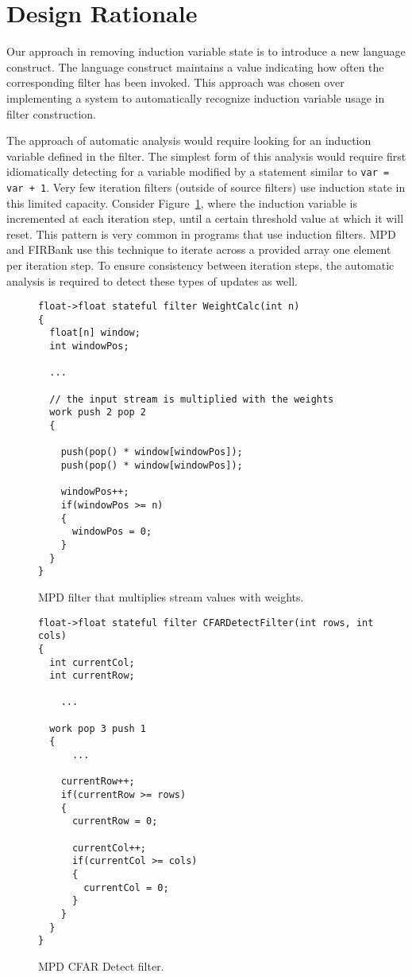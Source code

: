 \section{Design Rationale}

Our approach in removing induction variable state is to introduce a new language construct.  The language construct maintains a value indicating how often the corresponding filter has been invoked.  This approach was chosen over implementing a system to automatically recognize induction variable usage in filter construction.

The approach of automatic analysis would require looking for an induction variable defined in the filter.  The simplest form of this analysis would require first idiomatically detecting for a variable modified by a statement similar to \texttt{var = var + 1}.  Very few iteration filters (outside of source filters) use induction state in this limited capacity.  Consider Figure~\ref{fig:weight-calc}, where the induction variable is incremented at each iteration step, until a certain threshold value at which it will reset.  This pattern is very common in programs that use induction filters.  MPD and FIRBank use this technique to iterate across a provided array one element per iteration step.  To ensure consistency between iteration steps, the automatic analysis is required to detect these types of updates as well.  

\begin{figure}[t]
{\eightpoint
\begin{verbatim}
float->float stateful filter WeightCalc(int n)
{
  float[n] window;
  int windowPos;

  ...

  // the input stream is multiplied with the weights
  work push 2 pop 2
  {

    push(pop() * window[windowPos]);
    push(pop() * window[windowPos]);

    windowPos++;
    if(windowPos >= n)
    {
      windowPos = 0;
    }
  }
}
\end{verbatim}
\caption{MPD filter that multiplies stream values with weights.\protect\label{fig:weight-calc}}}
\end{figure}

\begin{figure}[t]
{\eightpoint
\begin{verbatim}
float->float stateful filter CFARDetectFilter(int rows, int cols)
{
  int currentCol;
  int currentRow;

    ...

  work pop 3 push 1
  {
      ...

    currentRow++;
    if(currentRow >= rows)
    {
      currentRow = 0;

      currentCol++;
      if(currentCol >= cols)
      {
        currentCol = 0;
      }
    }
  }
}
\end{verbatim}
\caption{MPD CFAR Detect filter.\protect\label{fig:cfar-detect-filter}}}
\end{figure}

